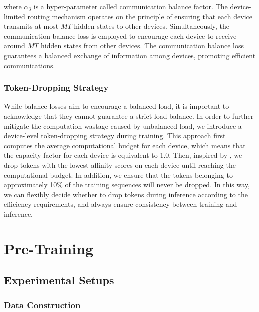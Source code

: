 where $\alpha_{3}$ is a hyper-parameter called communication balance factor. The device-limited routing mechanism operates on the principle of ensuring that each device transmits at most $MT$ hidden states to other devices. Simultaneously, the communication balance loss is employed to encourage each device to receive around $MT$ hidden states from other devices. The communication balance loss guarantees a balanced exchange of information among devices, promoting efficient communications. 

\subsubsection{Token-Dropping Strategy}

While balance losses aim to encourage a balanced load, it is important to acknowledge that they cannot guarantee a strict load balance. In order to further mitigate the computation wastage caused by unbalanced load, we introduce a device-level token-dropping strategy during training. This approach first computes the average computational budget for each device, which means that the capacity factor for each device is equivalent to 1.0. Then, inspired by \citet{bpr}, we drop tokens with the lowest affinity scores on each device until reaching the computational budget. In addition, we ensure that the tokens belonging to approximately 10\% of the training sequences will never be dropped. In this way, we can flexibly decide whether to drop tokens during inference according to the efficiency requirements, and always ensure consistency between training and inference. 

\section{Pre-Training}
\label{sec:pre-training}

\subsection{Experimental Setups}

\subsubsection{Data Construction}

